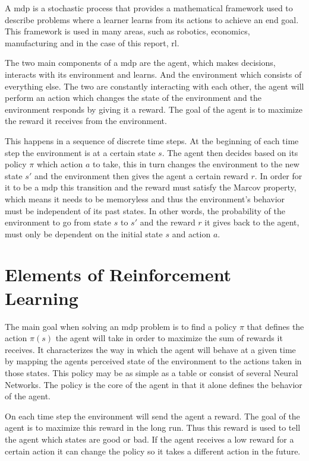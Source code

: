 A \acrfull{mdp} is a stochastic process that provides a mathematical framework used to describe problems where a learner learns from its actions to achieve an end goal. This framework is used in many areas, such as robotics, economics, manufacturing and in the case of this report, \acrlong{rl}. 

The two main components of a \gls{mdp} are the agent, which makes decisions, interacts with its environment and learns. And the environment which consists of everything else. The two are constantly interacting with each other, the agent will perform an action which changes the state of the environment and the environment responds by giving it a reward. The goal of the agent is to maximize the reward it receives from the environment.

This happens in a sequence of discrete time steps. At the beginning of each time step the environment is at a certain state $s$. The agent then decides based on its policy $\pi$ which action $a$ to take, this in turn changes the environment to the new state $s'$ and the environment then gives the agent a certain reward $r$. In order for it to be a \gls{mdp} this transition and the reward must satisfy the Marcov property, which means it needs to be memoryless and thus the environment's behavior must be independent of its past states. In other words, the probability of the environment to go from state $s$ to $s'$ and the reward $r$ it gives back to the agent, must only be dependent on the initial state $s$ and action $a$.

\section{Elements of Reinforcement Learning}

The main goal when solving an \gls{mdp} problem is to find a policy $\pi$ that defines the action $\pi\left(s\right)$ the agent will take in order to maximize the sum of rewards it receives. It characterizes the way in which the agent will behave at a given time by mapping the agents perceived state of the environment to the actions taken in those states. This policy may be as simple as a table or consist of several Neural Networks. The policy is the core of the agent in that it alone defines the behavior of the agent.

On each time step the environment will send the agent a reward. The goal of the agent is to maximize this reward in the long run. Thus this reward is used to tell the agent which states are good or bad. If the agent receives a low reward for a certain action it can change the policy so it takes a different action in the future.

